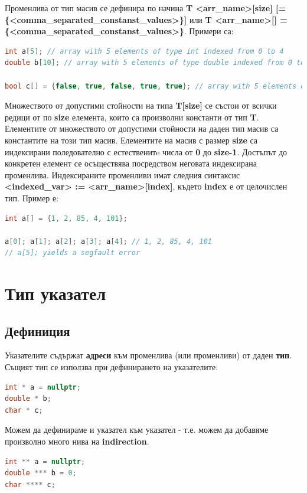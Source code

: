 \documentclass[fleqn,12pt]{article}
\begin{document}
Променлива от тип масив се дефинира по начина \textbf{T <arr\_name>[size] [= \{<comma\_separated\_constanst\_values>\}]} или \textbf{T <arr\_name>[] = \{<comma\_separated\_constanst\_values>\}}.
Примери са:

\begin{lstlisting}[language=C++, caption=Example array definitions]
int a[5]; // array with 5 elements of type int indexed from 0 to 4
double b[10]; // array with 5 elements of type double indexed from 0 to 9

bool c[] = {false, true, false, true, true}; // array with 5 elements of type bool
\end{lstlisting}

Множеството от допустими стойности на типа \textbf{T[size]} се състои от всички редици от по \textbf{size} елемента, които са произволни константи от тип \textbf{T}.
Елементите от множеството от допустими стойности на даден тип масив са константите на този тип масив.
\bigbreak
Елементите на масив с размер \textbf{size} са индексирани поледователно с естественитe числа от \textbf{0} до \textbf{size-1}.
Достъпът до конкретен елемент се осъществява посредством неговата индексирана променлива.
Индексираните променливи имат следния синтаксис \textbf{<indexed\_var> := <arr\_name>[index]}, където \textbf{index} е от целочислен тип.
Пример е:

\begin{lstlisting}[language=C++, caption=Example array item access]
int a[] = {1, 2, 85, 4, 101};

a[0]; a[1]; a[2]; a[3]; a[4]; // 1, 2, 85, 4, 101
// a[5]; yields a segfault error
\end{lstlisting}

\section{Тип указател}
\subsection{Дефиниция}
Указателите съдържат \textbf{адреси} към променлива (или променливи) от даден \textbf{тип}.
Същият тип се използва при дефинирането на указателите:

\begin{lstlisting}[language=C++, caption=Pointer example]
int * a = nullptr;
double * b;
char * c;
\end{lstlisting}

Можем да дефинираме и указател към указател - т.е. можем да добавяме произволно много нива на \textbf{indirection}.
\begin{lstlisting}[language=C++, caption=Pointer example]
int ** a = nullptr;
double *** b = 0;
char **** c;
\end{lstlisting}
\end{document}
